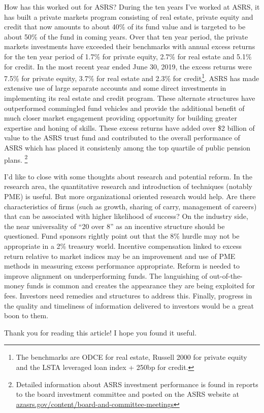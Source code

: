 \documentclass[12pt,english]{article}\usepackage[]{graphicx}\usepackage[]{color}
\begin{document}
How has this worked out for ASRS? During the ten years I've worked
at ASRS, it has built a private markets program consisting of real
estate, private equity and credit that now amounts to about 40\% of
its fund value and is targeted to be about 50\% of the fund in coming
years. Over that ten year period, the private markets investments
have exceeded their benchmarks with annual excess returns for the
ten year period of 1.7\% for private equity, 2.7\% for real estate
and 5.1\% for credit. In the most recent year ended June 30, 2019,
the excess returns were 7.5\% for private equity, 3.7\% for real estate
and 2.3\% for credit\footnote{The benchmarks are ODCE for real estate, Russell 2000 for private
equity and the LSTA leveraged loan index + 250bp for credit.}. ASRS has made extensive use of large separate accounts and some
direct investments in implementing its real estate and credit program.
These alternate structures have outperformed commingled fund vehicles
and provide the additional benefit of much closer market engagement
providing opportunity for building greater expertise and honing of
skills. These excess returns have added over \$2 billion of value
to the ASRS trust fund and contributed to the overall performance
of ASRS which has placed it consistenly among the top quartile of
public pension plans. \footnote{Detailed information about ASRS investment performance is found in
reports to the board investment committee and posted on the ASRS website
at \href{http://azasrs.gov/content/board-and-committee-meetings}{azasrs.gov/content/board-and-committee-meetings}}

I'd like to close with some thoughts about research and potential
reform. In the research area, the quantitative research and introduction
of techniques (notably PME) is useful. But more organizational oriented
research would help. Are there characteristics of firms (such as growth,
sharing of carry, management of careers) that can be associated with
higher likelihood of success? On the industry side, the near universality
of ``20 over 8'' as an incentive structure should be questioned.
Fund sponsors rightly point out that the 8\% hurdle may not be appropriate
in a 2\% treasury world. Incentive compensation linked to excess return
relative to market indices may be an improvement and use of PME methods
in measuring excess performance appropriate. Reform is needed to improve
alignment on underperforming funds. The languishing of out-of-the-money
funds is common and creates the appearance they are being exploited
for fees. Investors need remedies and structures to address this.
Finally, progress in the quality and timeliness of information delivered
to investors would be a great boon to them.

Thank you for reading this article! I hope you found it useful.

\printbibliography
\end{document}
